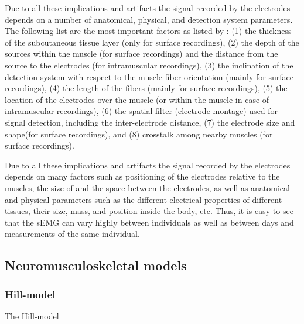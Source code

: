 Due to all these implications and artifacts the signal recorded by the electrodes depends on a number of anatomical, physical, and detection system parameters. The following list are the most important factors as listed by :
(1) the thickness of the subcutaneous tissue layer (only for surface recordings),
(2) the depth of the sources within the muscle (for surface recordings) and the distance from the source to the electrodes (for intramuscular recordings),
(3) the inclination of the detection system with respect to the muscle fiber orientation (mainly for surface recordings),
(4) the length of the fibers (mainly for surface recordings),
(5) the location of the electrodes over the muscle (or within the muscle in case of intramuscular recordings),
(6) the spatial filter (electrode montage) used for signal detection, including the inter-electrode distance,
(7) the electrode size and shape(for surface recordings), and
(8) crosstalk among nearby muscles (for surface recordings).

Due to all these implications and artifacts the signal recorded by the electrodes depends on many factors such as positioning of the electrodes relative to the muscles, the size of and the space between the electrodes, as well as anatomical and physical parameters such as the different electrical properties of different tissues, their size, mass, and position inside the body, etc.
Thus, it is easy to see that the \ac{sEMG} can vary highly between individuals as well as between days and measurements of the same individual.

\subsection{Neuromusculoskeletal models}
\label{sec:A-NMSModels}

\subsubsection{Hill-model}
\label{sec:A-HillModel}
The Hill-model 

